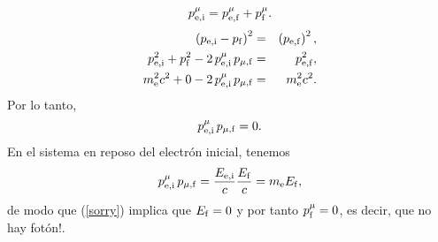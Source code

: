 \begin{itemize}
\begin{equation}
p^\mu_{\rm e,i}=p^\mu_{\rm e,f}+p^\mu_{\rm f}.
\end{equation}
\begin{eqnarray}
\left( p_{\rm e,i}-p_{\rm f}\right)^2 &=&\left( p_{\rm e,f}\right)^2 ,\\
p^2_{\rm e,i}+p^2_{\rm \rm f}-2\,p^\mu_{\rm e,i}\,p_{\mu, \rm f} &=& p^2_{\rm e,f} ,\\
m_{\rm e}^2 c^2+0-2\,p^\mu_{\rm e,i}\,p_{\mu, \rm f} &=& m_{\rm e}^2 c^2.
\end{eqnarray}
Por lo tanto,
\begin{equation}
p^\mu_{\rm e,i}\,p_{\mu, \rm f}=0.\label{sorry}
\end{equation}
En el sistema en reposo del electrón inicial, tenemos
\begin{equation}
p^\mu_{\rm e,i}\,p_{\mu, \rm f}=\frac{E_{\rm e,i}}{c}\frac{E_{\rm f}}{c} =m_{\rm
e}E_{\rm f},
\end{equation}
de modo que (\ref{sorry}) implica que $E_{\rm f}=0$ y por tanto $p^\mu_{\rm
f}=0$, es decir, que no hay fotón!.
\end{itemize}
